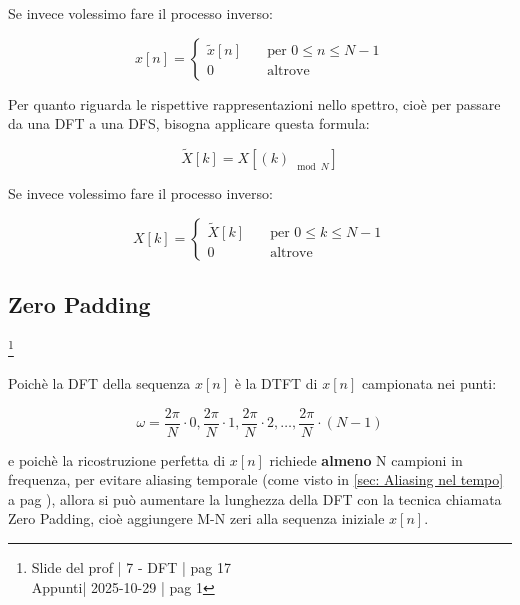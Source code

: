 Se invece volessimo fare il processo inverso: 

{
    \Large 
    \begin{equation}
        x \left[ n\right]
        = 
        \begin{cases}
            \tilde{x} \left[ n\right] \quad &\text{per } 0 \leq n \leq N -1
            \\
            0 \quad &\text{altrove }
        \end{cases}
    \end{equation}
}

Per quanto riguarda le rispettive rappresentazioni nello spettro, cioè per passare da una DFT a una DFS, bisogna applicare questa formula: 

{
    \Large 
    \begin{equation}
        \tilde{X} \left[k\right]
        = 
        X \left[ \left(k \right)_{\mod N}\right]
    \end{equation}
}

Se invece volessimo fare il processo inverso: 

{
    \Large 
    \begin{equation}
        X \left[ k\right]
        = 
        \begin{cases}
            \tilde{X} \left[ k\right] \quad &\text{per } 0 \leq k \leq N -1
            \\
            0 \quad &\text{altrove }
        \end{cases}
    \end{equation}
}

\newpage 

\subsection{Zero Padding}

\footnote{ 
    Slide del prof | 7 - DFT | pag 17\\
    Appunti| 2025-10-29 | pag 1
}

Poichè la DFT della sequenza $x \left[ n\right]$ è la DTFT di $x \left[ n\right]$ campionata nei punti: 

{
    \Large 
    \begin{equation}
        \omega = \dfrac{2 \pi}{N} \cdot 0, \dfrac{2 \pi}{N} \cdot 1, \dfrac{2 \pi}{N} \cdot 2, \dots, \dfrac{2 \pi}{N} \cdot \left(N -1\right) 
    \end{equation}
}

e poichè la ricostruzione perfetta di $x \left[ n\right]$ richiede \textbf{ almeno } N campioni in frequenza, per evitare aliasing temporale 
(come visto in \ref{sec: Aliasing nel tempo}  a pag \pageref{sec: Aliasing nel tempo}), 
allora si può aumentare la lunghezza della DFT con la tecnica chiamata Zero Padding, cioè aggiungere M-N zeri alla sequenza iniziale $x \left[ n\right]$. \newline 

